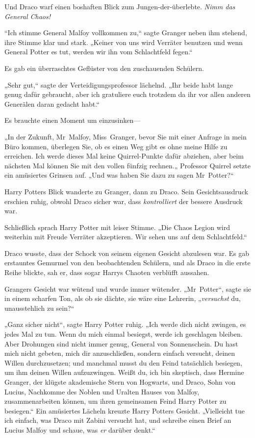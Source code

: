 {Und Draco warf einen boshaften Blick zum Jungen-der-überlebte. \emph{Nimm das General Chaos!}

“Ich stimme General Malfoy vollkommen zu,“ sagte Granger neben ihm stehend, ihre Stimme klar und stark. „Keiner von uns wird Verräter benutzen und wenn General Potter es tut, werden wir ihn vom Schlachtfeld fegen.“

Es gab ein überraschtes Geflüster von den zuschauenden Schülern.

„Sehr gut,“ sagte der Verteidigungsprofessor lächelnd. „Ihr beide habt lange genug dafür gebraucht, aber ich gratuliere euch trotzdem da ihr vor allen anderen Generälen daran gedacht habt.“

Es brauchte einen Moment um einzusinken—

„In der Zukunft, Mr~Malfoy, Miss~Granger, bevor Sie mit einer Anfrage in mein Büro kommen, überlegen Sie, ob es einen Weg gibt es ohne meine Hilfe zu erreichen. Ich werde dieses Mal keine Quirrel-Punkte dafür abziehen, aber beim nächsten Mal können Sie mit den vollen fünfzig rechnen.„ Professor Quirrel setzte ein amüsiertes Grinsen auf. „Und was haben Sie dazu zu sagen Mr~Potter?“

Harry Potters Blick wanderte zu Granger, dann zu Draco. Sein Gesichtsausdruck erschien ruhig, obwohl Draco sicher war, dass \emph{kontrolliert} der bessere Ausdruck war.

Schließlich sprach Harry Potter mit leiser Stimme. „Die Chaos Legion wird weiterhin mit Freude Verräter akzeptieren. Wir sehen uns auf dem Schlachtfeld.“

Draco wusste, dass der Schock von seinem eigenen Gesicht abzulesen war. Es gab erstauntes Gemurmel von den beobachtenden Schülern, und als Draco in die erste Reihe blickte, sah er, dass sogar Harrys Chaoten verblüfft aussahen.

Grangers Gesicht war wütend und wurde immer wütender. „Mr~Potter“, sagte sie in einem scharfen Ton, als ob sie dächte, sie wäre eine Lehrerin, „\emph{versuchst} du, unausstehlich zu sein?“

„Ganz sicher nicht“, sagte Harry Potter ruhig. „Ich werde dich nicht zwingen, es jedes Mal zu tun. Wenn du mich einmal besiegst, werde ich geschlagen bleiben. Aber Drohungen sind nicht immer genug, General von Sonnenschein. Du hast mich nicht gebeten, mich dir anzuschließen, sondern einfach versucht, deinen Willen durchzusetzen; und manchmal musst du den Feind tatsächlich besiegen, um ihm deinen Willen aufzuzwingen. Weißt du, ich bin skeptisch, dass Hermine Granger, der klügste akademische Stern von Hogwarts, und Draco, Sohn von Lucius, Nachkomme des Noblen und Uralten Hauses von Malfoy, zusammenarbeiten können, um ihren gemeinsamen Feind Harry Potter zu besiegen.“ Ein amüsiertes Lächeln kreuzte Harry Potters Gesicht. „Vielleicht tue ich einfach, was Draco mit Zabini versucht hat, und schreibe einen Brief an Lucius Malfoy und schaue, was \emph{er} darüber denkt.“

}
